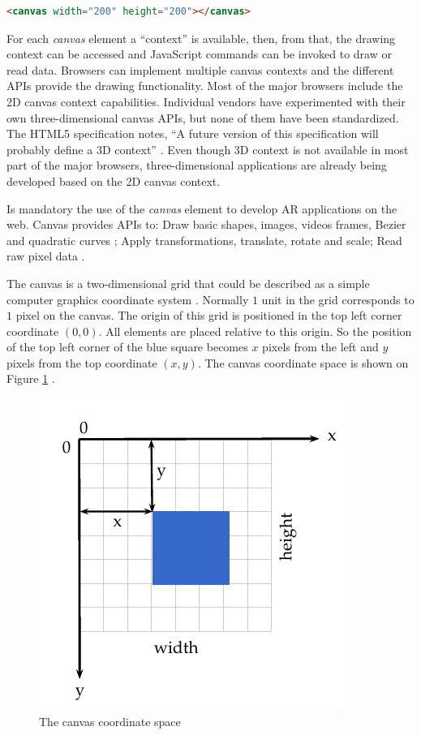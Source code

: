 \begin{lstlisting}[language=HTML,label={lst:canvas_element_markup},caption=The HTML canvas element markup]
<canvas width="200" height="200"></canvas>
\end{lstlisting}

For each \textit{canvas} element a ``context'' is available, then, from that, the drawing context can be accessed and JavaScript commands can be invoked to draw or read data. Browsers can implement multiple canvas contexts and the different APIs provide the drawing functionality. Most of the major browsers include the 2D canvas context capabilities. Individual vendors have experimented with their own three-dimensional canvas APIs, but none of them have been standardized. The HTML5 specification notes, ``A future version of this specification will probably define a 3D context'' \cite{Canvas2013}. Even though 3D context is not available in most part of the major browsers, three-dimensional applications are already being developed based on the 2D canvas context.

Is mandatory the use of the \textit{canvas} element to develop AR applications on the web. Canvas provides APIs to: Draw basic shapes, images, videos frames, Bezier and quadratic curves \cite{Hartley2004}; Apply transformations, translate, rotate and scale; Read raw pixel data \etc.

 The canvas is a two-dimensional grid that could be described as a simple computer graphics coordinate system \cite{Hartley2004}. Normally $1$ unit in the grid corresponds to $1$ pixel on the canvas. The origin of this grid is positioned in the top left corner coordinate $(0,0)$. All elements are placed relative to this origin. So the position of the top left corner of the blue square becomes $x$ pixels from the left and $y$ pixels from the top coordinate $(x,y)$. The canvas coordinate space is shown on Figure \ref{figure:canvas_axis} \cite{MDN2013}.

 \begin{figure}[!htb]
   \centering
   \includegraphics{chapters/basic_concepts/canvas_axis.pdf}
   \caption{The canvas coordinate space}
   \label{figure:canvas_axis}
 \end{figure}

